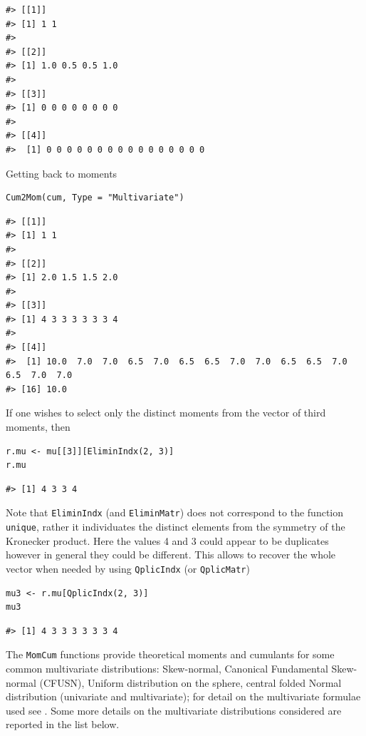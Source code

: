 \begin{verbatim}
#> [[1]]
#> [1] 1 1
#> 
#> [[2]]
#> [1] 1.0 0.5 0.5 1.0
#> 
#> [[3]]
#> [1] 0 0 0 0 0 0 0 0
#> 
#> [[4]]
#>  [1] 0 0 0 0 0 0 0 0 0 0 0 0 0 0 0 0
\end{verbatim}

Getting back to moments

\begin{verbatim}
Cum2Mom(cum, Type = "Multivariate")
\end{verbatim}

\begin{verbatim}
#> [[1]]
#> [1] 1 1
#> 
#> [[2]]
#> [1] 2.0 1.5 1.5 2.0
#> 
#> [[3]]
#> [1] 4 3 3 3 3 3 3 4
#> 
#> [[4]]
#>  [1] 10.0  7.0  7.0  6.5  7.0  6.5  6.5  7.0  7.0  6.5  6.5  7.0  6.5  7.0  7.0
#> [16] 10.0
\end{verbatim}

If one wishes to select only the distinct moments from the vector of third moments, then

\begin{verbatim}
r.mu <- mu[[3]][EliminIndx(2, 3)]
r.mu
\end{verbatim}

\begin{verbatim}
#> [1] 4 3 3 4
\end{verbatim}

Note that \texttt{EliminIndx} (and \texttt{EliminMatr}) does not correspond to the function \texttt{unique}, rather it individuates the distinct elements from the symmetry of the Kronecker product. Here the values 4 and 3 could appear to be duplicates however in general they could be different. This allows to recover the whole vector when needed by using \texttt{QplicIndx} (or \texttt{QplicMatr})

\begin{verbatim}
mu3 <- r.mu[QplicIndx(2, 3)]
mu3
\end{verbatim}

\begin{verbatim}
#> [1] 4 3 3 3 3 3 3 4
\end{verbatim}

The \texttt{MomCum} functions provide theoretical moments and cumulants for some common multivariate distributions: Skew-normal, Canonical Fundamental Skew-normal (CFUSN), Uniform distribution on the sphere, central folded Normal distribution (univariate and multivariate); for detail on the multivariate formulae used see \citet{jamma2021San}. Some more details on the multivariate distributions considered are reported in the list below.

